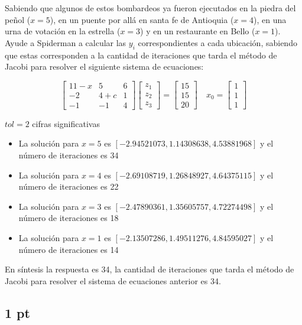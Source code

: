 Sabiendo que algunos de estos bombardeos ya fueron ejecutados en la piedra del peñol ($x=5$), en un puente por allá en santa fe de Antioquia ($x=4$),  en una urna de votación en la estrella ($x=3$) y en un restaurante en Bello  ($x=1$). Ayude a Spiderman a calcular las $y_i$ correspondientes a cada ubicación, sabiendo que estas corresponden a la cantidad de iteraciones que tarda el método de Jacobi para resolver el siguiente sistema de ecuaciones:

\[
    \begin{bmatrix}
        11 - x & 5     & 6 \\
        -2     & 4 + c & 1 \\
        -1     & -1    & 4
    \end{bmatrix}
    \begin{bmatrix}
        z_1 \\
        z_2 \\
        z_3
    \end{bmatrix}
    =
    \begin{bmatrix}
        15 \\
        15 \\
        20
    \end{bmatrix}
    \quad
    x_0 =
    \begin{bmatrix}
        1 \\
        1 \\
        1
    \end{bmatrix}
\]

$tol = 2$ cifras significativas


\begin{itemize}
    \item La solución para $x=5$ es $[-2.94521073,  1.14308638,  4.53881968]$ y el número de iteraciones es 34
    \item La solución para $x=4$ es $[-2.69108719,  1.26848927,  4.64375115]$ y el número de iteraciones es 22
    \item La solución para $x=3$ es $[-2.47890361,  1.35605757,  4.72274498]$ y el número de iteraciones es 18
    \item La solución para $x=1$ es $[-2.13507286,  1.49511276,  4.84595027]$ y el número de iteraciones es 14
\end{itemize}

En síntesis la respuesta es 34, la cantidad de iteraciones que tarda el método de Jacobi para resolver
el sistema de ecuaciones anterior es 34.

\subsection{1 pt}


